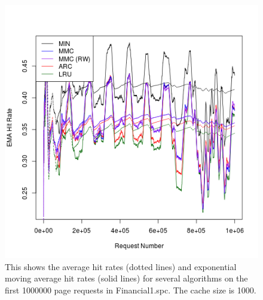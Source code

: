   \begin{figure}
  \centering
  \includegraphics[width=6in]{../media/ts_1000_1000_4000_2.png}
  \caption[Rolling hit rate for 1000 page caches on trace Financial1.spc]{This
  shows the average hit rates (dotted lines) and exponential moving average hit
  rates (solid lines) for several algorithms on the first 1000000 page requests
  in Financial1.spc. The cache size is 1000.}
  \label{fig:ts_1000_financial1}
  \end{figure}

